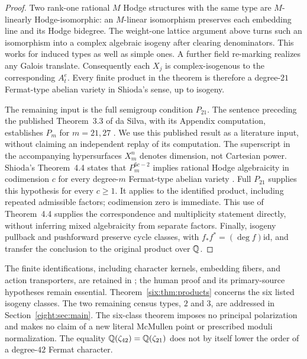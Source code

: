 \begin{proof}
Two rank-one rational $M$ Hodge structures with the same type are
$M$-linearly Hodge-isomorphic: an $M$-linear isomorphism preserves each
embedding line and its Hodge bidegree. The weight-one lattice argument
above turns such an isomorphism into a complex algebraic isogeny after
clearing denominators. This works for induced types as well as simple
ones. A further field re-marking realizes any Galois translate.
Consequently each $X_j$ is complex-isogenous to the corresponding
$A_t^e$. Every finite product in the theorem is therefore a degree-$21$
Fermat-type abelian variety in Shioda's sense, up to isogeny.

The remaining input is the full semigroup condition $P_{21}$.
The sentence preceding the published Theorem~3.3 of da Silva,
with its Appendix computation, establishes $P_m$ for $m=21,27$
\cite{daSilva2021Fermat}. We use this published result as a literature
input, without claiming an independent replay of its computation.
The superscript in the accompanying hypersurfaces $X_m^n$ denotes
dimension, not Cartesian power. Shioda's Theorem~4.4 states that
$P_m^{6c-2}$ implies rational Hodge algebraicity in codimension $c$
for every degree-$m$ Fermat-type abelian variety
\cite[Theorem~4.4, p.~72]{Shioda1981}.
Full $P_{21}$ supplies this hypothesis for every $c\geq1$.
It applies to the identified product, including repeated admissible
factors; codimension zero is immediate. This use of Theorem~4.4
supplies the correspondence and multiplicity statement directly,
without inferring mixed algebraicity from separate factors.
Finally, isogeny pullback and pushforward preserve cycle classes,
with $f_*f^*=(\deg f)\mathrm{id}$, and transfer the conclusion to
the original product over $\mathbb Q$.
\end{proof}

The finite identifications, including character kernels, embedding fibers,
and action transporters, are retained in
; the human proof
and its primary-source hypotheses remain essential.
Theorem~\ref{six:thm:products} concerns the six listed isogeny classes.
The two remaining census types, $2$ and $3$, are addressed in
Section~\ref{eight:sec:main}. The six-class theorem imposes no principal polarization and
makes no claim of a new literal McMullen point or prescribed moduli
normalization. The equality $\mathbb Q(\zeta_{42})=\mathbb Q(\zeta_{21})$ does not
by itself lower the order of a degree-$42$ Fermat character.

